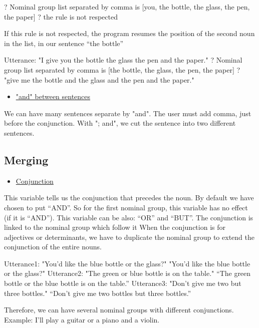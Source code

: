 \documentclass[twoside,a4paper,10pt]{report}
\begin{document}
\small
\begin{verbatimtab}
  ? Nominal group list separated by comma is [you, the bottle, the glass, the pen, the paper] 
  ? the rule is not respected
\end{verbatimtab}
\normalsize

If this rule is not respected, the program resumes the position of the second noun in the list, in our sentence “the bottle”


\small
\begin{verbatimtab}
  Utterance: "I give you the bottle the glass the pen and the paper." 
  ? Nominal group list separated by comma is [the bottle, the glass, the pen, the paper]
  ? "give me the bottle and the glass and the pen and the paper."
\end{verbatimtab}
\normalsize

\begin{itemize}
    \item  \underline{"and" between sentences}
\end{itemize}
We can have many sentences separate by "and". The user must add comma, just before the conjunction. With "; and", we cut the sentence into two different sentences.


\subsection{Merging}
\label{65cc30ed55db36c739ab349d7c58dfe8}%

\begin{itemize}
    \item  \underline{Conjunction}
\end{itemize}
This variable tells us the conjunction that precedes the noun. By default we have chosen to put “AND”. So for the first nominal group, this variable has no effect (if it is “AND”). This variable can be also: “OR” and “BUT”. The conjunction is linked to the nominal group which follow it
When the conjunction is for adjectives or determinants, we have to duplicate the nominal group to extend the conjunction of the entire nouns.


\small
\begin{verbatimtab}
  Utterance1: "You'd like the blue bottle or the glass?"
  "You'd like the blue bottle or the glass?"
  Utterance2: "The green or blue bottle is on the table."
  “The green bottle or the blue bottle is on the table.”
  Utterance3: "Don’t give me two but three bottles."
  “Don’t give me two bottles but three bottles.”
\end{verbatimtab}
\normalsize
Therefore, we can have several nominal groups with different conjunctions. Example: I'll play a guitar or a piano and a violin.
\end{document}

